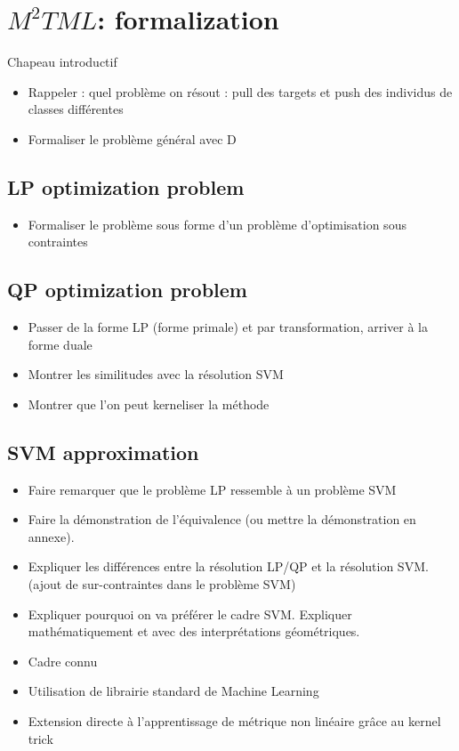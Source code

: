 \chapter{$M^2TML$: formalization}
\label{chap:formalization}
\minitoc

\noindent Chapeau introductif
\begin{itemize}
	\item Rappeler : quel problème on résout : pull des targets et push des individus de classes différentes
	\item Formaliser le problème général avec D
\end{itemize}

\section{LP optimization problem}
\begin{itemize}
	\item Formaliser le problème sous forme d'un problème d'optimisation sous contraintes
\end{itemize}

\section{QP optimization problem}
\begin{itemize}
	\item Passer de la forme LP (forme primale) et par transformation, arriver à la forme duale
	\item Montrer les similitudes avec la résolution SVM
	\item Montrer que l'on peut kerneliser la méthode
\end{itemize}


\section{SVM approximation}
\begin{itemize}
	\item Faire remarquer que le problème LP ressemble à un problème SVM
	\item Faire la démonstration de l'équivalence (ou mettre la démonstration en annexe).
	\item Expliquer les différences entre la résolution LP/QP et la résolution SVM. (ajout de sur-contraintes dans le problème SVM)
	\item Expliquer pourquoi on va préférer le cadre SVM. Expliquer mathématiquement et avec des interprétations géométriques. 
	\item Cadre connu
	\item Utilisation de librairie standard de Machine Learning
	\item Extension directe à l'apprentissage de métrique non linéaire grâce au kernel trick
\end{itemize}

